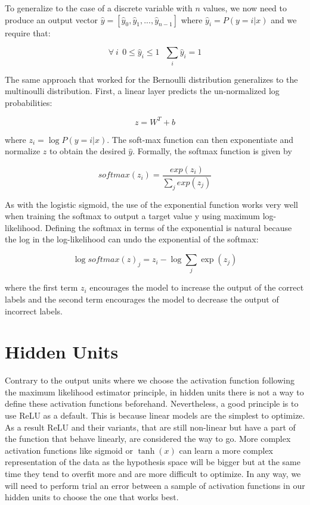 To generalize to the case of a discrete variable with $n$ values, we now need to produce an output vector $\hat{y}=[ \hat{y}_0, \hat{y}_1,... , \hat{y}_{n - 1}]$ where $ \hat{y}_i = P(y=i \vert x) $ and we require that:

$$ \forall ~ i ~~ 0 \le \hat{y}_i \le 1   ~~~ \sum_{i} \hat{y}_i = 1 $$

\newpage
\noindent The same approach that worked for the Bernoulli distribution generalizes to the multinoulli distribution. First, a linear layer predicts the un-normalized log probabilities:

$$ z = W^T + b $$

where $ z_i = \log P(y=i \vert x)$. The soft-max function can then exponentiate and normalize $z$ to obtain the desired $\hat{y}$. Formally, the softmax function is given by

$$ softmax (z_i) = \frac{exp(z_i)}{\sum_j exp(z_j)}   $$

\noindent As with the logistic sigmoid, the use of the exponential function works very well when training the softmax to output a target value y using maximum log-likelihood. Defining the softmax in terms of the exponential is natural because the log in the log-likelihood can undo the exponential of the softmax:

$$\log softmax (z)_j = z_i - \log \sum_j \exp{(z_j)}  $$

where the first term $z_i$ encourages the model to increase the output of the correct labels and the second term encourages the model to decrease the output of incorrect labels.

\section{Hidden Units}

Contrary to the output units where we choose the activation function following the maximum likelihood estimator principle, in hidden units there is not a way to define these activation functions beforehand. Nevertheless, a good principle is to use ReLU as a default. This is because linear models are the simplest to optimize. As a result ReLU and their variants, that are still non-linear but have a part of the function that behave linearly, are considered the way to go. More complex activation functions like sigmoid or $\tanh (x)$ can learn a more complex representation of the data as the hypothesis space will be bigger but at the same time they tend to overfit more and are more difficult to optimize. In any way, we will need to perform trial an error between a sample of activation functions in our hidden units to choose the one that works best.

